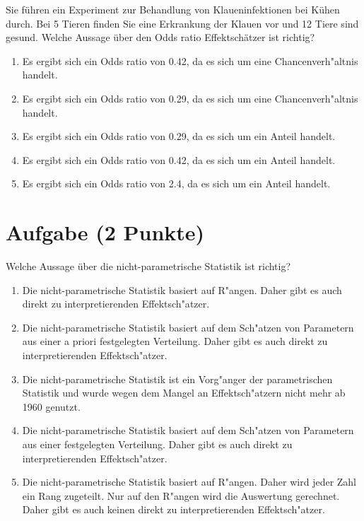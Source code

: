 \documentclass[a4paper, 10pt]{scrartcl}\usepackage[]{graphicx}\usepackage[]{color}
\begin{document}
Sie f{\"u}hren ein Experiment zur Behandlung von Klaueninfektionen bei K{\"u}hen
durch. Bei 5 Tieren finden Sie eine Erkrankung der Klauen vor und
12 Tiere sind gesund. Welche Aussage {\"u}ber den Odds ratio
Effektsch{\"a}tzer ist richtig?



\begin{enumerate}
\item [\textbf{A} \msquare] Es ergibt sich ein Odds ratio von 0.42, da es sich um eine Chancenverh{"a}ltnis handelt.
\item [\textbf{B} \msquare] Es ergibt sich ein Odds ratio von 0.29, da es sich um eine Chancenverh{"a}ltnis handelt.
\item [\textbf{C} \msquare] Es ergibt sich ein Odds ratio von 0.29, da es sich um ein Anteil handelt.
\item [\textbf{D} \msquare] Es ergibt sich ein Odds ratio von 0.42, da es sich um ein Anteil handelt.
\item [\textbf{E} \msquare] Es ergibt sich ein Odds ratio von 2.4, da es sich um ein Anteil handelt.
\end{enumerate}

\section{Aufgabe \hfill (2 Punkte)}




Welche Aussage {\"u}ber die nicht-parametrische Statistik ist richtig?



\begin{enumerate}
\item [\textbf{A} \msquare] Die nicht-parametrische Statistik basiert auf R{"a}ngen. Daher gibt es auch direkt zu interpretierenden Effektsch{"a}tzer.
\item [\textbf{B} \msquare] Die nicht-parametrische Statistik basiert auf dem Sch{"a}tzen von Parametern aus einer a priori festgelegten Verteilung. Daher gibt es auch direkt zu interpretierenden Effektsch{"a}tzer.
\item [\textbf{C} \msquare] Die nicht-parametrische Statistik ist ein Vorg{"a}nger der parametrischen Statistik und wurde wegen dem Mangel an Effektsch{"a}tzern nicht mehr ab 1960 genutzt.
\item [\textbf{D} \msquare] Die nicht-parametrische Statistik basiert auf dem Sch{"a}tzen von Parametern aus einer festgelegten Verteilung. Daher gibt es auch direkt zu interpretierenden Effektsch{"a}tzer.
\item [\textbf{E} \msquare] Die nicht-parametrische Statistik basiert auf R{"a}ngen. Daher wird jeder Zahl ein Rang zugeteilt. Nur auf den R{"a}ngen wird die Auswertung gerechnet. Daher gibt es auch keinen direkt zu interpretierenden Effektsch{"a}tzer.
\end{enumerate}
\end{document}
